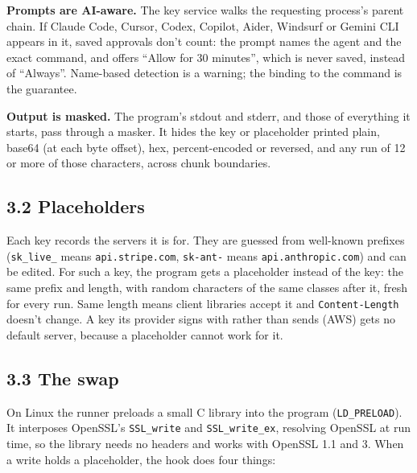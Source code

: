 \documentclass[
  11pt]{article}
\begin{document}
\textbf{Prompts are AI-aware.} The key
service walks the requesting process's
parent chain. If Claude Code, Cursor,
Codex, Copilot, Aider, Windsurf or
Gemini CLI appears in it, saved
approvals don't count: the prompt names
the agent and the exact command, and
offers ``Allow for 30 minutes'', which
is never saved, instead of ``Always''.
Name-based detection is a warning; the
binding to the command is the guarantee.

\textbf{Output is masked.} The program's
stdout and stderr, and those of
everything it starts, pass through a
masker. It hides the key or placeholder
printed plain, base64 (at each byte
offset), hex, percent-encoded or
reversed, and any run of 12 or more of
those characters, across chunk
boundaries.

\subsection*{3.2
Placeholders}\label{placeholders}

Each key records the servers it is for.
They are guessed from well-known
prefixes (\texttt{sk\_live\_} means
\texttt{api.stripe.com},
\texttt{sk-ant-} means
\texttt{api.anthropic.com}) and can be
edited. For such a key, the program gets
a placeholder instead of the key: the
same prefix and length, with random
characters of the same classes after it,
fresh for every run. Same length means
client libraries accept it and
\texttt{Content-Length} doesn't change.
A key its provider signs with rather
than sends (AWS) gets no default server,
because a placeholder cannot work for
it.

\subsection*{3.3 The
swap}\label{the-swap}

On Linux the runner preloads a small C
library into the program
(\texttt{LD\_PRELOAD}). It interposes
OpenSSL's \texttt{SSL\_write} and
\texttt{SSL\_write\_ex}, resolving
OpenSSL at run time, so the library
needs no headers and works with OpenSSL
1.1 and 3. When a write holds a
placeholder, the hook does four things:
\end{document}
